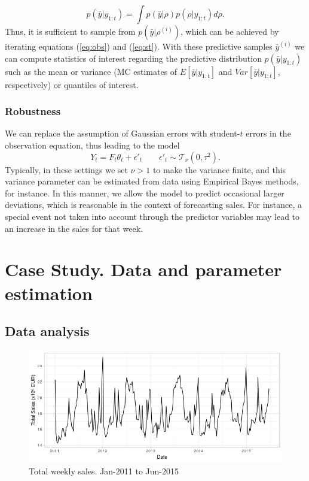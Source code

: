\[
p(\bar{y} | y_{1:t}) = \int p(\bar{y}| \rho)p(\rho | y_{1:t}) d\rho.
\]
Thus, it is sufficient to sample from $p(\bar{y}| \rho^{(i)})$, which can be achieved by iterating equations (\ref{eq:obs}) and (\ref{eq:st}). With these predictive samples $\bar{y}^{(i)}$ we can compute statistics of interest regarding the predictive distribution   $p(\bar{y} | y_{1:t})$ such as the mean or variance (MC estimates of $E[ \bar{y} | y_{1:t}]$ and $Var[\bar{y} | y_{1:t}]$, respectively) or quantiles of interest.\\


\subsubsection{Robustness}

We can replace the assumption of Gaussian errors with student-$t$ errors in the observation equation, thus leading to the model
$$ 
Y_{t} = F_t \theta_t + \epsilon'_t \qquad \epsilon'_t \sim \mathcal{T}_\nu(0, \tau^2).
$$
Typically, in these settings we set $\nu > 1$ to make the variance finite, and this variance parameter can be estimated from data using Empirical Bayes methods, for instance.
In this manner, we allow the model to predict occasional larger deviations, which is reasonable in the context of forecasting sales. For instance, a special event not taken into account through the predictor variables may lead to an increase in the sales for that week.


\section{Case Study. Data and parameter estimation}

\subsection{Data analysis}


\begin{figure}[h]
\centering
\includegraphics[scale=0.6]{figures/01_Sales.png}
\caption{Total weekly sales. Jan-2011 to Jun-2015}\label{fig:sales}
\end{figure}



